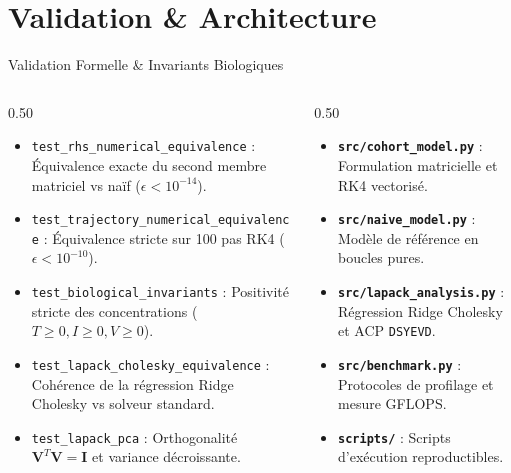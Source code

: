 \documentclass[aspectratio=169, 10pt, french]{beamer}
\begin{document}
\section{Validation \& Architecture}
\begin{frame}{Validation Formelle \& Invariants Biologiques}
    \begin{columns}[c]
        \begin{column}{0.50\textwidth}
            \begin{cadrehpc}
                \footnotesize
                \begin{itemize}
                    \item \texttt{test\_rhs\_numerical\_equivalence} : Équivalence exacte du second membre matriciel vs naïf ($\epsilon < 10^{-14}$).
                    \item \texttt{test\_trajectory\_numerical\_equivalence} : Équivalence stricte sur 100 pas RK4 ($\epsilon < 10^{-10}$).
                    \item \texttt{test\_biological\_invariants} : Positivité stricte des concentrations ($T \ge 0, I \ge 0, V \ge 0$).
                    \item \texttt{test\_lapack\_cholesky\_equivalence} : Cohérence de la régression Ridge Cholesky vs solveur standard.
                    \item \texttt{test\_lapack\_pca} : Orthogonalité $\mathbf{V}^T\mathbf{V} = \mathbf{I}$ et variance décroissante.
                \end{itemize}
            \end{cadrehpc}
        \end{column}

        \begin{column}{0.50\textwidth}
            \begin{cadreconcept}
                \footnotesize
                \begin{itemize}
                    \item \textbf{\texttt{src/cohort\_model.py}} : Formulation matricielle et RK4 vectorisé.
                    \item \textbf{\texttt{src/naive\_model.py}} : Modèle de référence en boucles pures.
                    \item \textbf{\texttt{src/lapack\_analysis.py}} : Régression Ridge Cholesky et ACP \texttt{DSYEVD}.
                    \item \textbf{\texttt{src/benchmark.py}} : Protocoles de profilage et mesure GFLOPS.
                    \item \textbf{\texttt{scripts/}} : Scripts d'exécution reproductibles.
                \end{itemize}
            \end{cadreconcept}
        \end{column}
    \end{columns}
\end{frame}
\end{document}
